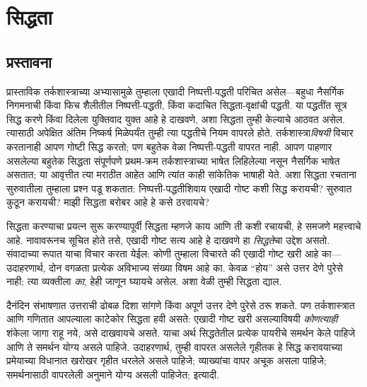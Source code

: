 \chapter{सिद्धता}\label{mth:prf:chap}









\section{प्रस्तावना}\label{mth:prf:int:sec}

प्रास्ताविक तर्कशास्त्राच्या अभ्यासामुळे तुम्हाला एखादी निष्पत्ती-पद्धती परिचित असेल---बहुधा नैसर्गिक निगमनाची किंवा फिच शैलीतील निष्पत्ती-पद्धती, किंवा कदाचित सिद्धता-वृक्षांची पद्धती. या पद्धतींत सूत्र सिद्ध करणे किंवा दिलेला युक्तिवाद युक्त आहे हे दाखवणे, अशा सिद्धता तुम्ही केल्याचे आठवत असेल. त्यासाठी अपेक्षित अंतिम निष्कर्ष मिळेपर्यंत तुम्ही त्या पद्धतीचे नियम वापरले होते. तर्कशास्त्रा\emph{विषयी} विचार करतानाही आपण गोष्टी सिद्ध करतो; पण बहुतेक वेळा निष्पत्ती-पद्धती वापरत नाही. आपण पाहणार असलेल्या बहुतेक सिद्धता संपूर्णपणे प्रथम-क्रम तर्कशास्त्राच्या भाषेत लिहिलेल्या नसून नैसर्गिक भाषेत असतात; या आवृत्तीत त्या मराठीत आहेत आणि त्यांत काही सांकेतिक भाषाही येते. अशा सिद्धता रचताना सुरुवातीला तुम्हाला प्रश्न पडू शकतात: निष्पत्ती-पद्धतीशिवाय एखादी गोष्ट कशी सिद्ध करायची? सुरुवात कुठून करायची? माझी सिद्धता बरोबर आहे हे कसे ठरवायचे?

सिद्धता करण्याचा प्रयत्न सुरू करण्यापूर्वी सिद्धता म्हणजे काय आणि ती कशी रचायची, हे समजणे महत्त्वाचे आहे. नावावरूनच सूचित होते तसे, एखादी गोष्ट सत्य आहे हे दाखवणे हा \emph{सिद्धते}चा उद्देश असतो. संवादाच्या रूपात याचा विचार करता येईल: कोणी तुम्हाला विचारते की एखादी गोष्ट खरी आहे का---उदाहरणार्थ, दोन वगळता प्रत्येक अविभाज्य संख्या विषम आहे का. केवळ “होय” असे उत्तर देणे पुरेसे नाही; त्या व्यक्तीला \emph{का}, हेही जाणून घ्यायचे असेल. अशा वेळी तुम्ही सिद्धता द्याल.

दैनंदिन संभाषणात उत्तराची ढोबळ दिशा सांगणे किंवा अपूर्ण उत्तर देणे पुरेसे ठरू शकते. पण तर्कशास्त्रात आणि गणितात आपल्याला काटेकोर सिद्धता हवी असते: एखादी गोष्ट खरी असल्याविषयी \emph{कोणत्याही} शंकेला जागा राहू नये, असे दाखवायचे असते. याचा अर्थ सिद्धतेतील प्रत्येक पायरीचे समर्थन केले पाहिजे आणि ते समर्थन योग्य असले पाहिजे. उदाहरणार्थ, तुम्ही वापरत असलेले गृहीतक हे सिद्ध करावयाच्या प्रमेयाच्या विधानात खरोखर गृहीत धरलेले असले पाहिजे; व्याख्यांचा वापर अचूक असला पाहिजे; समर्थनासाठी वापरलेली अनुमाने योग्य असली पाहिजेत; इत्यादी.

